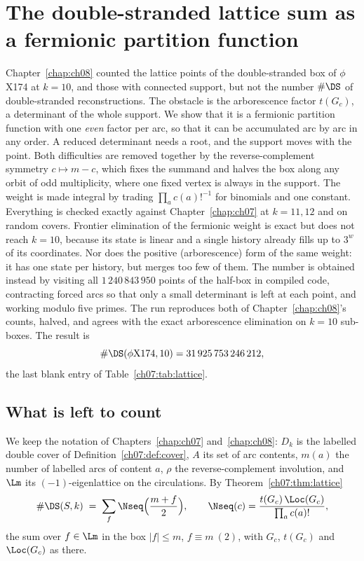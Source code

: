 \chapter[A fermionic partition function]{The double-stranded lattice sum as a fermionic partition function}\label{chap:ch09}
\begin{chaptersummary}
Chapter~\ref{chap:ch08} counted the lattice points of the double-stranded box of $\phi$X174 at $k=10$, and
those with connected support, but not the number $\#\DS$ of double-stranded
reconstructions. The obstacle is the arborescence factor $t(G_c)$, a determinant of the whole
support. We show that it is a fermionic partition function with one \emph{even} factor per
arc, so that it can be accumulated arc by arc in any order. A reduced determinant needs a
root, and the support moves with the point. Both difficulties are removed together by the
reverse-complement symmetry $c\mapsto m-c$, which fixes the summand and halves the box along
any orbit of odd multiplicity, where one fixed vertex is always in the support. The weight is
made integral by trading $\prod_a c(a)!^{-1}$ for binomials and one constant. Everything is
checked exactly against Chapter~\ref{chap:ch07} at $k=11,12$ and on random covers. Frontier elimination of the
fermionic weight is exact but does not reach $k=10$, because its state is linear and a single
history already fills up to $3^{w}$ of its coordinates. Nor does the positive (arborescence)
form of the same weight: it has one state per history, but merges too few of them. The number
is obtained instead by visiting all $1\,240\,843\,950$ points of the half-box in compiled
code, contracting forced arcs so that only a small determinant is left at each point, and
working modulo five primes. The run reproduces both of Chapter~\ref{chap:ch08}'s counts, halved, and agrees with
the exact arborescence elimination on $k=10$ sub-boxes. The result is
\[
\#\DS(\phi\mathrm{X}174,10)=31\,925\,753\,246\,212 ,
\]
the last blank entry of Table~\ref{ch07:tab:lattice}.
\end{chaptersummary}

\section{What is left to count}\label{ch09:sec:left}

We keep the notation of Chapters~\ref{chap:ch07} and~\ref{chap:ch08}: $D_k$ is the labelled double
cover of Definition~\ref{ch07:def:cover}, $A$ its set of arc contents, $m(a)$ the number of
labelled arcs of content $a$, $\rho$ the reverse-complement involution, and $\Lm$ its
$(-1)$-eigenlattice on the circulations. By Theorem~\ref{ch07:thm:lattice}
\begin{equation}\label{ch09:eq:sum}
\#\DS(S,k)\;=\;\sum_{f}\Nseq\Big(\frac{m+f}{2}\Big),
\qquad
\Nseq(c)=\frac{t(G_c)\,\Loc(G_c)}{\prod_a c(a)!},
\end{equation}
the sum over $f\in\Lm$ in the box $|f|\le m$, $f\equiv m\ (2)$, with $G_c$, $t(G_c)$ and
$\Loc(G_c)$ as there.

